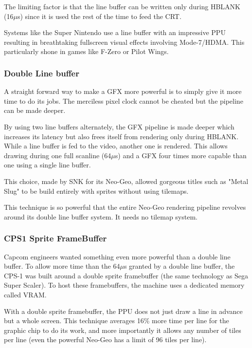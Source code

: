 The limiting factor is that the line buffer can be written only during HBLANK (16$\mu$s) since it is used the rest of the time to feed the CRT.

Systems like the Super Nintendo use a line buffer with an impressive PPU resulting in breathtaking fullscreen visual effects involving Mode-7/HDMA. This particularly shone in games like F-Zero or Pilot Wings.








\subsubsection{Double Line buffer}
A straight forward way to make a GFX more powerful is to simply give it more time to do its jobs. The merciless pixel clock cannot be cheated but the pipeline can be made deeper.

By using two line buffers alternately, the GFX pipeline is made deeper which increases its latency but also frees itself from rendering only during HBLANK. While a line buffer is fed to the video, another one is rendered. This allows drawing during one full scanline (64$\mu$s) and a GFX four times more capable than one using a single line buffer. 

This choice, made by SNK for its Neo-Geo, allowed gorgeous titles such as "Metal Slug" to be build entirely with sprites without using tilemaps. 

This technique is so powerful that the entire Neo-Geo rendering pipeline revolves around its double line buffer system. It needs no tilemap system.


\subsubsection{CPS1 Sprite FrameBuffer}
Capcom engineers wanted something even more powerful than a double line buffer. To allow more time than the 64$\mu$s granted by a double line buffer, the CPS-1 was built around a double sprite framebuffer (the same technology as  Sega Super Scaler). To host these framebuffers, the machine uses a dedicated memory called VRAM.

With a double sprite framebuffer, the PPU does not just draw a line in advance but a whole screen. This technique averages 16\% more time per line for the graphic chip to do its work, and more importantly it allows any number of tiles per line (even the powerful Neo-Geo has a limit of 96 tiles per line).


